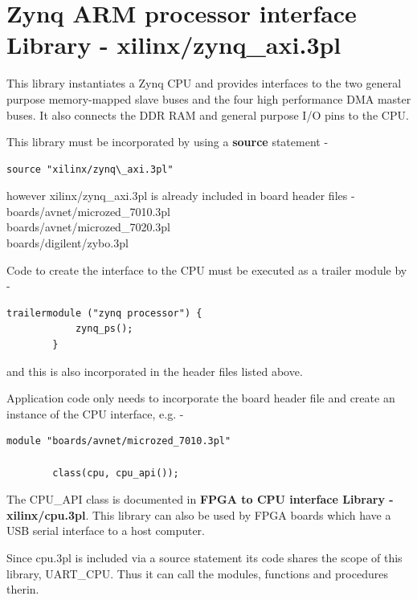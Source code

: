 \pagebreak

\section{Zynq ARM processor interface Library - xilinx/zynq\_axi.3pl}
\label{chap:lmzynqaxilib}

    This library instantiates a Zynq CPU and provides interfaces to
    the two general purpose memory-mapped slave buses and the four
    high performance DMA master buses. It also connects the DDR RAM
    and general purpose I/O pins to the CPU.
    
    This library must be incorporated by using a {\bf source} statement -
    \begin{lstlisting}[gobble=4, language=threepl]
       source "xilinx/zynq\_axi.3pl"
    \end{lstlisting}

    however xilinx/zynq\_axi.3pl is already included in board header files -\\
    boards/avnet/microzed\_7010.3pl\\
    boards/avnet/microzed\_7020.3pl\\
    boards/digilent/zybo.3pl
    
    Code to create the interface to the CPU must be executed as a trailer module
    by -
    
    \begin{lstlisting}[gobble=4, language=threepl]
        trailermodule ("zynq processor") {
            zynq_ps();
        }
    \end{lstlisting}
    and this is also incorporated in the header files listed above.

    Application code only needs to incorporate the board header file
    and create an instance of the CPU interface, e.g. -

    \begin{lstlisting}[gobble=4, language=threepl]
        module "boards/avnet/microzed_7010.3pl"

        class(cpu, cpu_api());
    \end{lstlisting}
    The CPU\_API class is documented in
     {\bf FPGA to CPU interface Library
    - xilinx/cpu.3pl}. This library can also be used by FPGA boards
    which have a USB serial interface to a host computer.
   
    Since cpu.3pl is included via a source statement its code shares the scope
    of this library, UART\_CPU. Thus it can call the modules, functions and
    procedures therin.
    
